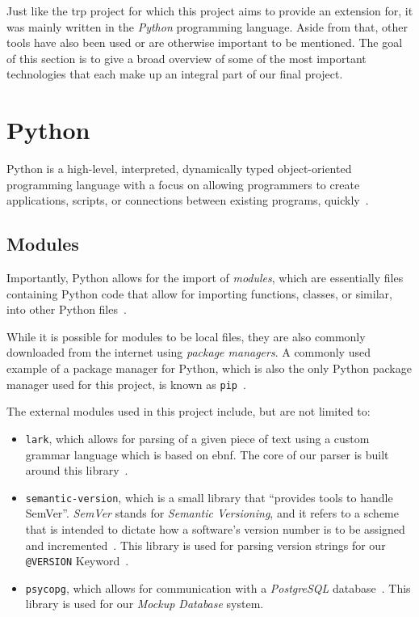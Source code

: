 
Just like the \gls{trp} project for which this project aims to provide an extension for, it was mainly written in the \textit{Python} programming language. Aside from that, other tools have also been used or are otherwise important to be mentioned. The goal of this section is to give a broad overview of some of the most important technologies that each make up an integral part of our final project. 

\section{Python}

Python is a high-level, interpreted, dynamically typed object-oriented programming language with a focus on allowing programmers to create applications, scripts, or connections between existing programs, quickly~\cite{py-summary}.

\subsection{Modules}

Importantly, Python allows for the import of \textit{modules}, which are essentially files containing Python code that allow for importing functions, classes, or similar, into other Python files~\cite{py-modules-summary}.

While it is possible for modules to be local files, they are also commonly downloaded from the internet using \textit{package managers}. A commonly used example of a package manager for Python, which is also the only Python package manager used for this project, is known as \verb|pip|~\cite{py-modules-install}.

The external modules used in this project include, but are not limited to:
\begin{itemize}
    \item \verb|lark|, which allows for parsing of a given piece of text using a custom grammar language which is based on \gls{ebnf}. The core of our parser is built around this library~\cite{py-module-lark}.
    \item \verb|semantic-version|, which is a small library that ``provides tools to handle \\
    SemVer''\cite{py-module-semantic-version}. \textit{SemVer} stands for \textit{Semantic Versioning}, and it refers to a scheme that is intended to dictate how a software's version number is to be assigned and incremented~\cite{SemanticVersioning}. This library is used for parsing version strings for our \verb|@VERSION| Keyword~\cite{py-module-semantic-version}.
    \item \verb|psycopg|, which allows for communication with a \textit{PostgreSQL} database~\cite{py-module-psycopg}. This library is used for our \textit{Mockup Database} system.
\end{itemize}


